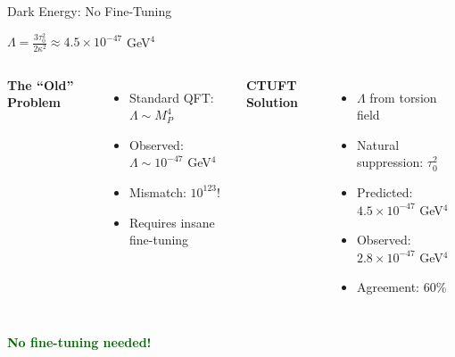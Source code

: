 \documentclass[aspectratio=169]{beamer}
\begin{document}
\begin{frame}{Dark Energy: No Fine-Tuning}
\begin{center}
\Large
$\Lambda = \frac{3\tau_0^2}{2\kappa^2} \approx 4.5 \times 10^{-47}$ GeV$^4$
\end{center}

\vspace{0.5cm}

\begin{columns}
\textbf{The ``Old'' Problem}
\begin{itemize}
    \item Standard QFT: $\Lambda \sim M_P^4$
    \item Observed: $\Lambda \sim 10^{-47}$ GeV$^4$
    \item Mismatch: $10^{123}$!
    \item Requires insane fine-tuning
\end{itemize}

\textbf{CTUFT Solution}
\begin{itemize}
    \item $\Lambda$ from torsion field
    \item Natural suppression: $\tau_0^2$
    \item Predicted: $4.5\times 10^{-47}$ GeV$^4$
    \item Observed: $2.8\times 10^{-47}$ GeV$^4$
    \item Agreement: 60\%
\end{itemize}
\end{columns}

\vspace{0.5cm}
\begin{center}
\textcolor{darkgreen}{\textbf{No fine-tuning needed!}}
\end{center}
\end{frame}
\end{document}
